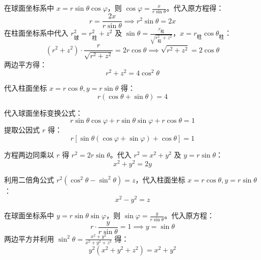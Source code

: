 \begin{solution}
    在球面坐标系中 $x = r \sin \theta \cos \varphi$，则 $\cos \varphi = \frac{x}{r \sin \theta}$。代入原方程得：
    \begin{equation*}
        r = \frac{2x}{r \sin \theta} \implies r^2 \sin \theta = 2x
    \end{equation*}
    在柱面坐标系中代入 $r_{\text{球}}^2 = r_{\text{柱}}^2 + z^2$ 及 $\sin \theta = \frac{r_{\text{柱}}}{\sqrt{r_{\text{柱}}^2 + z^2}}$，$x = r_{\text{柱}} \cos \theta_{\text{柱}}$：
    \begin{equation*}
        (r^2 + z^2) \cdot \frac{r}{\sqrt{r^2 + z^2}} = 2r \cos \theta \implies \sqrt{r^2 + z^2} = 2 \cos \theta
    \end{equation*}
    两边平方得：
    \begin{equation*}
        \boxed{r^2 + z^2 = 4\cos^2 \theta}
    \end{equation*}

    代入柱面坐标 $x = r \cos \theta, y = r \sin \theta$ 得：
    \begin{equation*}
        \boxed{r (\cos \theta + \sin \theta) = 4}
    \end{equation*}

    代入球面坐标变换公式：
    \begin{equation*}
        r \sin \theta \cos \varphi + r \sin \theta \sin \varphi + r \cos \theta = 1
    \end{equation*}
    提取公因式 $r$ 得：
    \begin{equation*}
        \boxed{r [\sin \theta (\cos \varphi + \sin \varphi) + \cos \theta] = 1}
    \end{equation*}

    方程两边同乘以 $r$ 得 $r^2 = 2r \sin \theta$。代入 $r^2 = x^2 + y^2$ 及 $y = r \sin \theta$：
    \begin{equation*}
        \boxed{x^2 + y^2 = 2y}
    \end{equation*}

    利用二倍角公式 $r^2 (\cos^2 \theta - \sin^2 \theta) = z$，代入柱面坐标 $x = r \cos \theta, y = r \sin \theta$：
    \begin{equation*}
        \boxed{x^2 - y^2 = z}
    \end{equation*}

    在球面坐标系中 $y = r \sin \theta \sin \varphi$，则 $\sin \varphi = \frac{y}{r \sin \theta}$。代入原方程：
    \begin{equation*}
        r \cdot \frac{y}{r \sin \theta} = 1 \implies y = \sin \theta
    \end{equation*}
    两边平方并利用 $\sin^2 \theta = \frac{x^2 + y^2}{x^2 + y^2 + z^2}$ 得：
    \begin{equation*}
        \boxed{y^2 (x^2 + y^2 + z^2) = x^2 + y^2}
    \end{equation*}
\end{solution}


